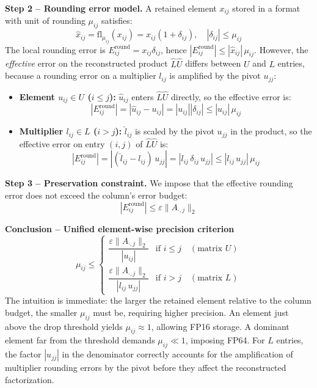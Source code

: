 \documentclass[11pt,a4paper]{article}
\begin{document}
\textbf{Step 2 -- Rounding error model.} A retained element $x_{ij}$ stored in a format with unit of rounding $\mu_{ij}$ satisfies:
\begin{equation}
    \hat{x}_{ij} = \mathrm{fl}_{\mu_{ij}}(x_{ij}) = x_{ij}(1+\delta_{ij}), \quad |\delta_{ij}| \le \mu_{ij}
\end{equation}
The local rounding error is $E_{ij}^{\text{round}} = x_{ij}\delta_{ij}$, hence $|E_{ij}^{\text{round}}| \le |\hat{x}_{ij}|\,\mu_{ij}$.
However, the \emph{effective} error on the reconstructed product $\hat{L}\hat{U}$ differs between $U$ and $L$ entries, because a rounding error on a multiplier $l_{ij}$ is amplified by the pivot $u_{jj}$:

\begin{itemize}
    \item \textbf{Element $u_{ij} \in U$ ($i \le j$):} $\hat{u}_{ij}$ enters $\hat{L}\hat{U}$ directly, so the effective error is:
    \begin{equation}
        |E_{ij}^{\text{round}}| = |\hat{u}_{ij} - u_{ij}| = |u_{ij}||\delta_{ij}| \le |u_{ij}|\,\mu_{ij}
    \end{equation}

    \item \textbf{Multiplier $l_{ij} \in L$ ($i > j$):} $\hat{l}_{ij}$ is scaled by the pivot $u_{jj}$ in the product, so the effective error on entry $(i,j)$ of $\hat{L}\hat{U}$ is:
    \begin{equation}
        |E_{ij}^{\text{round}}| = |(\hat{l}_{ij} - l_{ij})\,u_{jj}| = |l_{ij}\,\delta_{ij}\,u_{jj}| \le |l_{ij}\,u_{jj}|\,\mu_{ij}
    \end{equation}
\end{itemize}

\textbf{Step 3 -- Preservation constraint.} We impose that the effective rounding error does not exceed the column's error budget:
\begin{equation}
    |E_{ij}^{\text{round}}| \le \varepsilon\|A_{\cdot,j}\|_2
\end{equation}

\textbf{Conclusion -- Unified element-wise precision criterion}
\begin{equation}\label{eq:unified_criterion}
    \boxed{
    \mu_{ij} \le \begin{cases}
        \dfrac{\varepsilon\|A_{\cdot,j}\|_2}{|u_{ij}|}         & \text{if } i \le j \quad (\text{matrix } U) \\[10pt]
        \dfrac{\varepsilon\|A_{\cdot,j}\|_2}{|l_{ij}\,u_{jj}|} & \text{if } i > j  \quad (\text{matrix } L)
    \end{cases}
    }
\end{equation}
The intuition is immediate: the larger the retained element relative to the column budget, the smaller $\mu_{ij}$ must be, requiring higher precision. An element just above the drop threshold yields $\mu_{ij} \approx 1$, allowing FP16 storage. A dominant element far from the threshold demands $\mu_{ij} \ll 1$, imposing FP64. For $L$ entries, the factor $|u_{jj}|$ in the denominator correctly accounts for the amplification of multiplier rounding errors by the pivot before they affect the reconstructed factorization.
\end{document}
